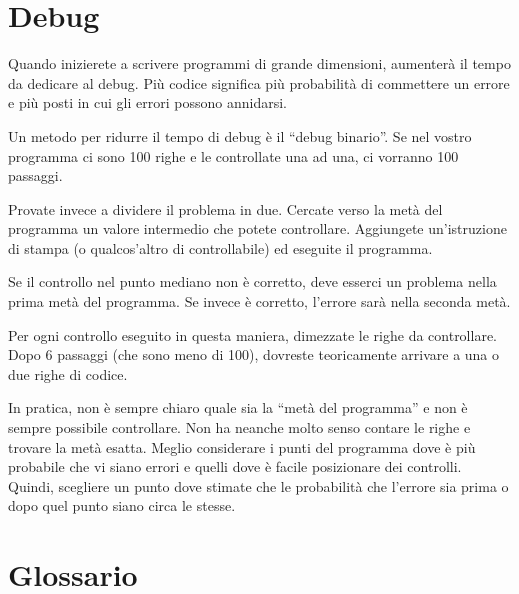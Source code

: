 \documentclass[10pt]{book}
\begin{document}
\section{Debug}
\label{bisectbug}

Quando inizierete a scrivere programmi di grande dimensioni, aumenterà il tempo da dedicare al debug. Più codice significa più probabilità di commettere un errore e più posti in cui gli errori possono annidarsi.

Un metodo per ridurre il tempo di debug è il ``debug binario''.
Se nel vostro programma ci sono 100 righe e le controllate una ad una, ci vorranno 100 passaggi.

Provate invece a dividere il problema in due. Cercate verso la metà del programma un valore intermedio che potete controllare. Aggiungete un'istruzione di stampa (o qualcos'altro di controllabile) ed eseguite il programma.

Se il controllo nel punto mediano non è corretto, deve esserci un problema nella prima metà del programma. Se invece è corretto, l'errore sarà nella seconda metà.

Per ogni controllo eseguito in questa maniera, dimezzate le righe da controllare. Dopo 6 passaggi (che sono meno di 100), dovreste teoricamente arrivare a una o due righe di codice.

In pratica, non è sempre chiaro quale sia la ``metà del programma'' e non è sempre possibile controllare. Non ha neanche molto senso contare le righe e trovare la metà esatta. Meglio considerare i punti del programma dove è più probabile che vi siano errori e quelli dove è facile posizionare dei controlli. Quindi, scegliere un punto dove stimate che le probabilità che l'errore sia prima o dopo quel punto siano circa le stesse.


\section{Glossario}
\end{document}
